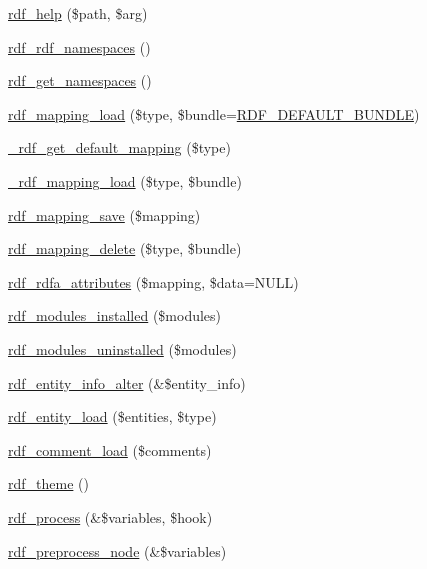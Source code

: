 \begin{DoxyCompactItemize}
\item 
\hyperlink{rdf_8module_a8940fb807d1b3e212e4b534e7ee3259a}{rdf\_\-help} (\$path, \$arg)
\item 
\hyperlink{group__rdf_gaed65d375e129af058947c2d614eb1d3c}{rdf\_\-rdf\_\-namespaces} ()
\item 
\hyperlink{group__rdf_ga395ff70b78c0363ca9ce631b3d15e774}{rdf\_\-get\_\-namespaces} ()
\item 
\hyperlink{group__rdf_ga130340d3ee5b36d5f7da31160b9460ac}{rdf\_\-mapping\_\-load} (\$type, \$bundle=\hyperlink{group__rdf_ga4f749985c55ac04563d6446524062ac9}{RDF\_\-DEFAULT\_\-BUNDLE})
\item 
\hyperlink{rdf_8module_acdafad7b66bf41db77c4039e2953053f}{\_\-rdf\_\-get\_\-default\_\-mapping} (\$type)
\item 
\hyperlink{rdf_8module_a0fc272cd2d678697bfba1457fc5ffa0f}{\_\-rdf\_\-mapping\_\-load} (\$type, \$bundle)
\item 
\hyperlink{group__rdf_ga1e628638b2684b9a5ebc0847066d9131}{rdf\_\-mapping\_\-save} (\$mapping)
\item 
\hyperlink{group__rdf_ga59c3470135f39d1b607e03a0aa774470}{rdf\_\-mapping\_\-delete} (\$type, \$bundle)
\item 
\hyperlink{group__rdf_ga9b02589c8277c732de8c035d5a606de9}{rdf\_\-rdfa\_\-attributes} (\$mapping, \$data=NULL)
\item 
\hyperlink{rdf_8module_a595f2f383674a0158f65f56337e157d3}{rdf\_\-modules\_\-installed} (\$modules)
\item 
\hyperlink{rdf_8module_a42149a7e3a19a0507a95a5824543b1a1}{rdf\_\-modules\_\-uninstalled} (\$modules)
\item 
\hyperlink{rdf_8module_aba691a244451c05199bf3aec8736fefe}{rdf\_\-entity\_\-info\_\-alter} (\&\$entity\_\-info)
\item 
\hyperlink{rdf_8module_a4def1bc6dc5210a6216c13493140c096}{rdf\_\-entity\_\-load} (\$entities, \$type)
\item 
\hyperlink{rdf_8module_ac54e6d05b05523c4f44e0e6f5901338b}{rdf\_\-comment\_\-load} (\$comments)
\item 
\hyperlink{rdf_8module_a3a42c02c77fb57187a0e6376e8f5c4fd}{rdf\_\-theme} ()
\item 
\hyperlink{rdf_8module_a33cf33f554fea60776a23c543557ff7b}{rdf\_\-process} (\&\$variables, \$hook)
\item 
\hyperlink{rdf_8module_aacee2147a5aacd82ccc64defded160af}{rdf\_\-preprocess\_\-node} (\&\$variables)

\end{DoxyCompactItemize}
